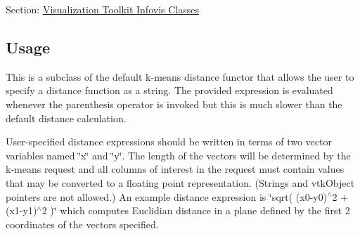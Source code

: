 Section\-: \hyperlink{sec_vtkinfovis}{Visualization Toolkit Infovis Classes} \hypertarget{vtkwidgets_vtkxyplotwidget_Usage}{}\subsection{Usage}\label{vtkwidgets_vtkxyplotwidget_Usage}
This is a subclass of the default k-\/means distance functor that allows the user to specify a distance function as a string. The provided expression is evaluated whenever the parenthesis operator is invoked but this is much slower than the default distance calculation.

User-\/specified distance expressions should be written in terms of two vector variables named \char`\"{}x\char`\"{} and \char`\"{}y\char`\"{}. The length of the vectors will be determined by the k-\/means request and all columns of interest in the request must contain values that may be converted to a floating point representation. (Strings and vtk\-Object pointers are not allowed.) An example distance expression is \char`\"{}sqrt( (x0-\/y0)$^\wedge$2 + (x1-\/y1)$^\wedge$2 )\char`\"{} which computes Euclidian distance in a plane defined by the first 2 coordinates of the vectors specified.

